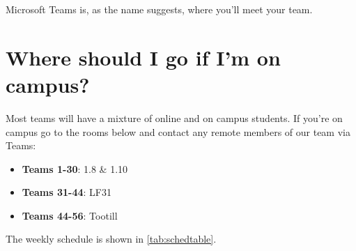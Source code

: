 \documentclass[
]{book}
\providecommand{\tightlist}{%
  \setlength{\itemsep}{0pt}\setlength{\parskip}{0pt}}
\begin{document}
Microsoft Teams is, as the name suggests, where you'll meet your team.

\hypertarget{campus}{%
\section{Where should I go if I'm on campus?}\label{campus}}

Most teams will have a mixture of online and on campus students. If you're on campus go to the rooms below and contact any remote members of our team via Teams:

\begin{itemize}
\tightlist
\item
  \textbf{Teams 1-30}: 1.8 \& 1.10
\item
  \textbf{Teams 31-44}: LF31
\item
  \textbf{Teams 44-56}: Tootill
\end{itemize}

The weekly schedule is shown in \ref{tab:schedtable}.
\end{document}
